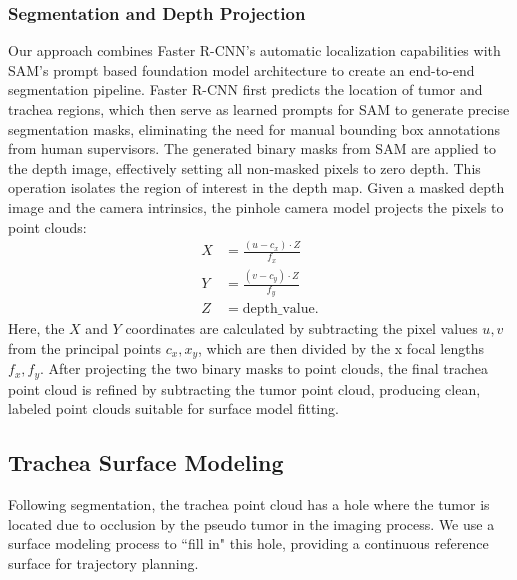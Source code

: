 \subsubsection{Segmentation and Depth Projection}
Our approach combines Faster R-CNN's automatic localization capabilities with SAM's prompt based foundation model architecture to create an end-to-end segmentation pipeline. Faster R-CNN first predicts the location of tumor and trachea regions, which then serve as learned prompts for SAM to generate precise segmentation masks, eliminating the need for manual bounding box annotations from human supervisors. The generated binary masks from SAM are applied to the depth image, effectively setting all non-masked pixels to zero depth. This operation isolates the region of interest in the depth map. Given a masked depth image and the camera intrinsics, the pinhole camera model projects the pixels to point clouds: 
\begin{align*}
X &= \frac{(u - c_x) \cdot Z}{f_x} \\
Y &= \frac{(v - c_y) \cdot Z}{f_y} \\
Z &= \text{depth\_value}.
\end{align*}
Here, the $X$ and $Y$ coordinates are calculated by subtracting the pixel values $u,v$ from the principal points $c_x, x_y$, which are then divided by the x focal lengths $f_x, f_y$. After projecting the two binary masks to point clouds, the final trachea point cloud is refined by subtracting the tumor point cloud, producing clean, labeled point clouds suitable for surface model fitting. 

\subsection{Trachea Surface Modeling}
Following segmentation, the trachea point cloud has a hole where the tumor is located due to occlusion by the pseudo tumor in the imaging process. We use a surface modeling process to ``fill in" this hole, providing a continuous reference surface for trajectory planning.

